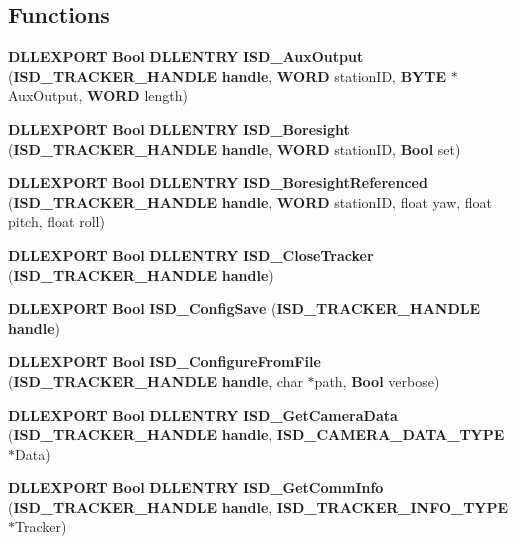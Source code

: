 \subsection*{\-Functions}
\begin{DoxyCompactItemize}
\item 
{\bf \-D\-L\-L\-E\-X\-P\-O\-R\-T} {\bf \-Bool} {\bf \-D\-L\-L\-E\-N\-T\-R\-Y} {\bf \-I\-S\-D\-\_\-\-Aux\-Output} ({\bf \-I\-S\-D\-\_\-\-T\-R\-A\-C\-K\-E\-R\-\_\-\-H\-A\-N\-D\-L\-E} {\bf handle}, {\bf \-W\-O\-R\-D} station\-I\-D, {\bf \-B\-Y\-T\-E} $\ast$\-Aux\-Output, {\bf \-W\-O\-R\-D} length)
\item 
{\bf \-D\-L\-L\-E\-X\-P\-O\-R\-T} {\bf \-Bool} {\bf \-D\-L\-L\-E\-N\-T\-R\-Y} {\bf \-I\-S\-D\-\_\-\-Boresight} ({\bf \-I\-S\-D\-\_\-\-T\-R\-A\-C\-K\-E\-R\-\_\-\-H\-A\-N\-D\-L\-E} {\bf handle}, {\bf \-W\-O\-R\-D} station\-I\-D, {\bf \-Bool} set)
\item 
{\bf \-D\-L\-L\-E\-X\-P\-O\-R\-T} {\bf \-Bool} {\bf \-D\-L\-L\-E\-N\-T\-R\-Y} {\bf \-I\-S\-D\-\_\-\-Boresight\-Referenced} ({\bf \-I\-S\-D\-\_\-\-T\-R\-A\-C\-K\-E\-R\-\_\-\-H\-A\-N\-D\-L\-E} {\bf handle}, {\bf \-W\-O\-R\-D} station\-I\-D, float yaw, float pitch, float roll)
\item 
{\bf \-D\-L\-L\-E\-X\-P\-O\-R\-T} {\bf \-Bool} {\bf \-D\-L\-L\-E\-N\-T\-R\-Y} {\bf \-I\-S\-D\-\_\-\-Close\-Tracker} ({\bf \-I\-S\-D\-\_\-\-T\-R\-A\-C\-K\-E\-R\-\_\-\-H\-A\-N\-D\-L\-E} {\bf handle})
\item 
{\bf \-D\-L\-L\-E\-X\-P\-O\-R\-T} {\bf \-Bool} {\bf \-I\-S\-D\-\_\-\-Config\-Save} ({\bf \-I\-S\-D\-\_\-\-T\-R\-A\-C\-K\-E\-R\-\_\-\-H\-A\-N\-D\-L\-E} {\bf handle})
\item 
{\bf \-D\-L\-L\-E\-X\-P\-O\-R\-T} {\bf \-Bool} {\bf \-I\-S\-D\-\_\-\-Configure\-From\-File} ({\bf \-I\-S\-D\-\_\-\-T\-R\-A\-C\-K\-E\-R\-\_\-\-H\-A\-N\-D\-L\-E} {\bf handle}, char $\ast$path, {\bf \-Bool} verbose)
\item 
{\bf \-D\-L\-L\-E\-X\-P\-O\-R\-T} {\bf \-Bool} {\bf \-D\-L\-L\-E\-N\-T\-R\-Y} {\bf \-I\-S\-D\-\_\-\-Get\-Camera\-Data} ({\bf \-I\-S\-D\-\_\-\-T\-R\-A\-C\-K\-E\-R\-\_\-\-H\-A\-N\-D\-L\-E} {\bf handle}, {\bf \-I\-S\-D\-\_\-\-C\-A\-M\-E\-R\-A\-\_\-\-D\-A\-T\-A\-\_\-\-T\-Y\-P\-E} $\ast$\-Data)
\item 
{\bf \-D\-L\-L\-E\-X\-P\-O\-R\-T} {\bf \-Bool} {\bf \-D\-L\-L\-E\-N\-T\-R\-Y} {\bf \-I\-S\-D\-\_\-\-Get\-Comm\-Info} ({\bf \-I\-S\-D\-\_\-\-T\-R\-A\-C\-K\-E\-R\-\_\-\-H\-A\-N\-D\-L\-E} {\bf handle}, {\bf \-I\-S\-D\-\_\-\-T\-R\-A\-C\-K\-E\-R\-\_\-\-I\-N\-F\-O\-\_\-\-T\-Y\-P\-E} $\ast$\-Tracker)

\end{DoxyCompactItemize}
